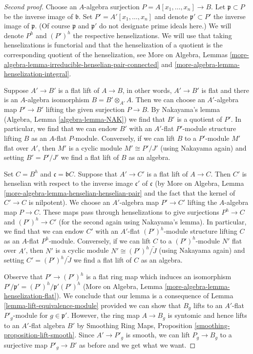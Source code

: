 \documentclass{stacks-project}
\theoremstyle{plain}
\theoremstyle{definition}
\theoremstyle{remark}
\numberwithin{equation}{subsection}
\begin{document}
\begin{proof}[Second proof]
Choose an $A$-algebra surjection $P = A[x_1, \ldots, x_n] \to B$.
Let $\mathfrak p \subset P$ be the inverse image of $\mathfrak b$.
Set $P' = A'[x_1, \ldots, x_n]$ and denote $\mathfrak p' \subset P'$
the inverse image of $\mathfrak p$. (Of course $\mathfrak p$
and $\mathfrak p'$ do not designate prime ideals here.)
We will denote $P^h$ and $(P')^h$ the respective henselizations.
We will use that taking henselizations is functorial and that
the henselization of a quotient is the corresponding quotient
of the henselization, see
More on Algebra, Lemmas
\ref{more-algebra-lemma-irreducible-henselian-pair-connected} and
\ref{more-algebra-lemma-henselization-integral}.

\medskip\noindent
Suppose $A' \to B'$ is a flat lift of $A \to B$, in other words,
$A' \to B'$ is flat and there is an $A$-algebra isomorphism
$B = B' \otimes_{A'} A$. Then we can choose an $A'$-algebra map
$P' \to B'$ lifting the given surjection $P \to B$.
By Nakayama's lemma (Algebra, Lemma \ref{algebra-lemma-NAK})
we find that $B'$ is a quotient of $P'$. In particular, we find
that we can endow $B'$ with an $A'$-flat $P'$-module structure
lifting $B$ as an $A$-flat $P$-module.
Conversely, if we can lift $B$ to a $P'$-module $M'$ flat over $A'$,
then $M'$ is a cyclic module $M' \cong P'/J'$ (using Nakayama again)
and setting $B' = P'/J'$ we find a flat lift of $B$ as an algebra.

\medskip\noindent
Set $C = B^h$ and $\mathfrak c = \mathfrak bC$.
Suppose that $A' \to C'$ is a flat lift of $A \to C$.
Then $C'$ is henselian with respect to the inverse image
$\mathfrak c'$ of $\mathfrak c$
(by More on Algebra, Lemma \ref{more-algebra-lemma-henselian-henselian-pair}
and the fact that the kernel of $C' \to C$ is nilpotent).
We choose an $A'$-algebra map $P' \to C'$ lifting
the $A$-algebra map $P \to C$. These maps pass through
henselizations to give surjections $P^h \to C$ and $(P')^h \to C'$
(for the second again using Nakayama's lemma).
In particular, we find that we can endow $C'$ with an $A'$-flat
$(P')^h$-module structure lifting $C$ as an $A$-flat $P^h$-module.
Conversely, if we can lift $C$ to a $(P')^h$-module $N'$ flat over $A'$,
then $N'$ is a cyclic module $N' \cong (P')^h/\tilde J$
(using Nakayama again) and setting $C' = (P')^h/\tilde J$
we find a flat lift of $C$ as an algebra.

\medskip\noindent
Observe that $P' \to (P')^h$ is a flat ring map which
induces an isomorphism $P'/\mathfrak p' = (P')^h/\mathfrak p'(P')^h$
(More on Algebra, Lemma \ref{more-algebra-lemma-henselization-flat}).
We conclude that our lemma is a consequence of
Lemma \ref{lemma-lift-equivalence-module} provided we can
show that $B_g$ lifts to an $A'$-flat $P'_g$-module for
$g \in \mathfrak p'$. However, the ring map $A \to B_g$ is syntomic
and hence lifts to an $A'$-flat algebra $B'$ by
Smoothing Ring Maps, Proposition \ref{smoothing-proposition-lift-smooth}.
Since $A' \to P'_g$ is smooth, we can lift $P_g \to B_g$
to a surjective map $P'_g \to B'$ as before and we get what we want.
\end{proof}
\end{document}
